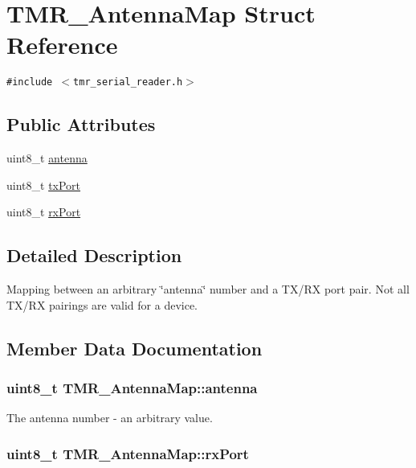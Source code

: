 \hypertarget{struct_t_m_r___antenna_map}{
\section{TMR\_\-AntennaMap Struct Reference}
\label{struct_t_m_r___antenna_map}
}
{\tt \#include $<$tmr\_\-serial\_\-reader.h$>$}

\subsection*{Public Attributes}
\begin{CompactItemize}
\item 
uint8\_\-t \hyperlink{struct_t_m_r___antenna_map_05405b9ffbd0d0c5b55f763fc8703c02}{antenna}
\item 
uint8\_\-t \hyperlink{struct_t_m_r___antenna_map_a10986aa7c5201a3c9414cac521a18c8}{txPort}
\item 
uint8\_\-t \hyperlink{struct_t_m_r___antenna_map_2d5aec9d0d67174cc56ba7e0138cd920}{rxPort}
\end{CompactItemize}


\subsection{Detailed Description}
Mapping between an arbitrary \char`\"{}antenna\char`\"{} number and a TX/RX port pair. Not all TX/RX pairings are valid for a device. 

\subsection{Member Data Documentation}
\hypertarget{struct_t_m_r___antenna_map_05405b9ffbd0d0c5b55f763fc8703c02}{
\subsubsection[{antenna}]{\setlength{\rightskip}{0pt plus 5cm}uint8\_\-t {\bf TMR\_\-AntennaMap::antenna}}}
\label{struct_t_m_r___antenna_map_05405b9ffbd0d0c5b55f763fc8703c02}


The antenna number - an arbitrary value. \hypertarget{struct_t_m_r___antenna_map_2d5aec9d0d67174cc56ba7e0138cd920}{
\subsubsection[{rxPort}]{\setlength{\rightskip}{0pt plus 5cm}uint8\_\-t {\bf TMR\_\-AntennaMap::rxPort}}}
\label{struct_t_m_r___antenna_map_2d5aec9d0d67174cc56ba7e0138cd920}


